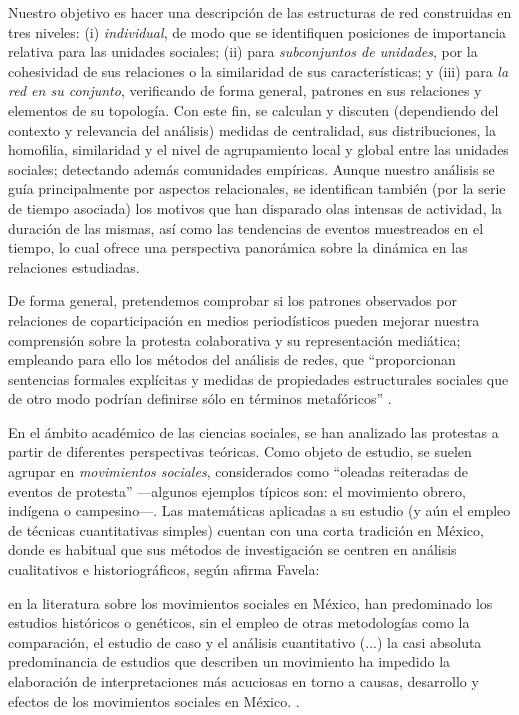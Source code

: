 \documentclass[letterpaper, 11pt]{book}
\theoremstyle{definition}
\theoremstyle{remark}
\begin{document}
Nuestro objetivo es hacer una descripción de las estructuras de red construidas en tres niveles: 
(i) \emph{individual}, de modo que se identifiquen posiciones de importancia relativa para las unidades sociales; 
(ii) para \emph{subconjuntos de unidades}, por la cohesividad de sus relaciones o la similaridad de sus características; y 
(iii) para \emph{la red en su conjunto}, verificando de forma general, patrones en sus relaciones y elementos de su topología. 
Con este fin, se calculan y discuten (dependiendo del contexto y relevancia del análisis) 
medidas de centralidad, sus distribuciones, la homofilia, similaridad y el nivel de agrupamiento local y global entre las unidades sociales; 
detectando además comunidades empíricas. 
Aunque nuestro análisis se guía principalmente por aspectos relacionales, se identifican también (por la serie de tiempo asociada) los motivos que han disparado olas intensas de actividad, la duración de las mismas, así como las tendencias de eventos muestreados en el tiempo, lo cual ofrece una perspectiva panorámica sobre la dinámica en las relaciones estudiadas. 

De forma general, pretendemos comprobar si los patrones observados por relaciones de coparticipación en medios periodísticos pueden mejorar nuestra comprensión sobre la protesta colaborativa y su representación mediática; 
empleando para ello los métodos del análisis de redes, que ``proporcionan sentencias formales explícitas y medidas de propiedades estructurales sociales que de otro modo podrían definirse sólo en términos metafóricos'' \citep[17]{1994_Wasserman_SNA}. 

En el ámbito académico de las ciencias sociales, se han analizado las protestas a partir de diferentes perspectivas teóricas. 
Como objeto de estudio, se suelen agrupar en \emph{movimientos sociales}, considerados como ``oleadas reiteradas de eventos de protesta'' \citep[3]{2016_Cadena_OMS} ---algunos ejemplos típicos son: el movimiento obrero, indígena o campesino---. 
Las matemáticas aplicadas a su estudio (y aún el empleo de técnicas cuantitativas simples) cuentan con una corta tradición en México, donde es habitual que sus métodos de investigación se centren en análisis cualitativos e historiográficos, según afirma Favela:

\begin{center}
    \begin{minipage}{0.9\linewidth}
        {\setlength{\parindent}{12pt}\small
        en la literatura sobre los movimientos sociales en México, han predominado los estudios históricos o genéticos, sin el empleo de otras metodologías como la comparación, el estudio de caso y el análisis cuantitativo (...) la casi absoluta predominancia de estudios que describen un movimiento ha impedido la elaboración de interpretaciones más acuciosas en torno a causas, desarrollo y efectos de los movimientos sociales en México. \normalsize \citep[161]{2005_Favela_PanoramaMS}.
        }
    \end{minipage}
\end{center}
\end{document}
